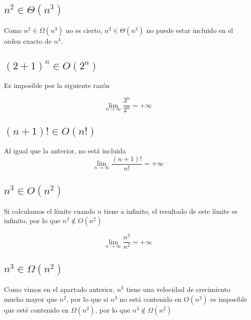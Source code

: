 \begin{twocolumn}
\subsection{$n^2 \in \Theta(n^3)$}


Como $n^2 \in \Omega(n^3)$ no es cierto, $n^2 \in \Theta(n^3)$ no puede estar incluido en el orden exacto de $n^3$.

\subsection{$(2 + 1)^n \in O(2^n)$}
\label{apartado9}


Es imposible por la siguiente razón

\begin{displaymath}
\lim_{n \rightarrow \infty} \frac{3^n}{2^n} = +\infty
\end{displaymath}

\subsection{$(n+1)! \in O(n!)$}

Al igual que la anterior, no está incluida
\begin{displaymath}
\lim_{n \rightarrow \infty} \frac{(n+1)!}{n!} = +\infty
\end{displaymath}

\subsection{$n^3 \in O(n^2)$}


Si calculamos el límite cuando $n$ tiene a infinito, el resultado de este límite es infinito, por lo que $n^3 \notin O(n^2)$

\begin{displaymath}
\lim_{n \rightarrow \infty} \frac{n^3}{n^2} = +\infty
\end{displaymath}

\subsection{$n^3 \in \Omega(n^2)$}


Como vimos en el apartado anterior, $n^3$ tiene una velocidad de crecimiento mucho mayor que $n^2$, por lo que si $n^3$ no está contenido en $O(n^2)$ es imposible que esté contenido en $\Omega(n^2)$, por lo que $n^3 \notin \Omega(n^2)$



\end{twocolumn}
